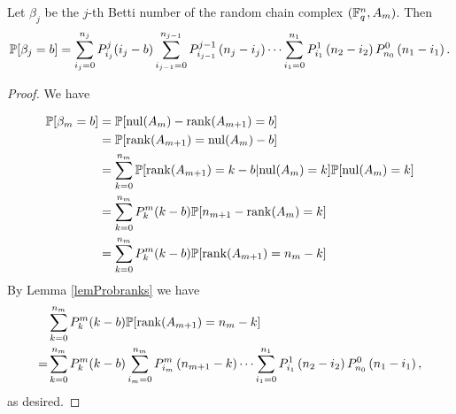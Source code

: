 \begin{theorem} Let $\beta_j$ be the $j$-th Betti number of the random chain complex $(\mathbb{F}_q^{n} , A_m)$. Then
	\[    
    \mathbb{P}[\beta_j = b] = \sum_{i_j=0}^{n_{j}} P_{i_j}^{j}(i_j-b)
    \sum_{i_{j-1}=0}^{n_{j-1}} P_{i_{j-1}}^{j-1}\left(n_{j} -i_j\right)
		\cdots
	\sum_{i_1 = 0}^{n_1} P_{i_1}^1\left(n_2 - i_2\right) P_{n_0}^0 \left(n_1 - i_1\right).
    \]
\end{theorem}
\begin{proof}
We have

\begin{align*}
  \mathbb{P}[\beta_{m} = b] 
   &= \mathbb{P}[\mathrm{nul}(A_{m}) - \operatorname{\mathrm{rank}}(A_{m+1}) = b]\\
   &= \mathbb{P}[\operatorname{\mathrm{rank}}(A_{m+1}) = \mathrm{nul}(A_{m}) - b]\\
   &= \sum_{k=0}^{n_{m}}\mathbb{P}[\operatorname{\mathrm{rank}}(A_{m+1}) = k - b| \mathrm{nul}(A_{m})=k] \mathbb{P}[\mathrm{nul}(A_{m}) = k]\\
   &= \sum_{k=0}^{n_{m}} P_{k}^{m}(k-b)\mathbb{P}[n_{m+1} - \operatorname{\mathrm{rank}}(A_{m}) = k]\\
   &= \sum_{k=0}^{n_{m}} P_{k}^{m}(k-b)\mathbb{P}[\operatorname{\mathrm{rank}}(A_{m+1}) = n_{m} - k]\\ 
\end{align*}
By Lemma \ref{lemProbranks} we have
\begin{align*}
 & \sum_{k=0}^{n_{m}} P_{k}^{m}(k-b)\mathbb{P}[\operatorname{\mathrm{rank}}(A_{m+1}) = n_{m} - k] \\
=& \sum_{k=0}^{n_{m}} P_{k}^{m}(k-b)\sum_{i_m=0}^{n_m} P_{i_m}^{m}\left(n_{m+1} -k\right)
		\cdots
	\sum_{i_1 = 0}^{n_1} P_{i_1}^1\left(n_2 - i_2\right) P_{n_0}^0 \left(n_1 - i_1\right), 
\end{align*}
as desired.
\end{proof}

